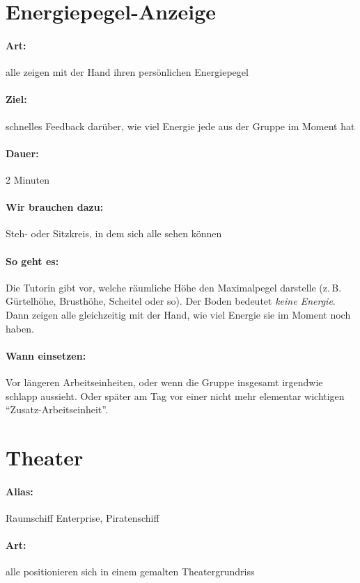 \section{Energiepegel-Anzeige}
\paragraph{Art:} alle zeigen mit der Hand ihren persönlichen Energiepegel
\paragraph{Ziel:} schnelles Feedback darüber, wie viel Energie jede aus der Gruppe im Moment hat
\paragraph{Dauer:} 2 Minuten
\paragraph{Wir brauchen dazu:} Steh- oder Sitzkreis, in dem sich alle sehen können
\paragraph{So geht es:} Die Tutorin gibt vor, welche räumliche Höhe den Maximalpegel darstelle (z.\,B.~ Gürtelhöhe, Brusthöhe, Scheitel oder so). Der Boden bedeutet \textit{keine Energie}. Dann zeigen alle gleichzeitig mit der Hand, wie viel Energie sie im Moment noch haben.
\paragraph{Wann einsetzen:} Vor längeren Arbeitseinheiten, oder wenn die Gruppe insgesamt irgendwie schlapp aussieht. Oder später am Tag vor einer nicht mehr elementar wichtigen "`Zusatz-Arbeitseinheit"'.

\section{Theater}
\paragraph{Alias:} Raumschiff Enterprise, Piratenschiff
\paragraph{Art:} alle positionieren sich in einem gemalten Theatergrundriss
